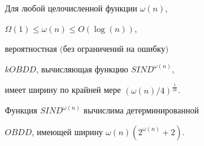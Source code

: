 \begin{thm}


Для любой целочисленной функции $\omega(n)$,


$\Omega(1) \le \omega(n) \le O(\log(n))$,


вероятностная $($без ограничений на ошибку$)$


$kOBDD$, вычисляющая функцию $SIND^{\omega(n)}$,


имеет ширину по крайней мере $(\omega(n)/4)^{\frac{1}{2k}}$.


Функция $SIND^{\omega(n)}$ вычислима детерминированной


$OBDD$, имеющей ширину $\omega(n)(2^{\omega(n)}+2)$.


\end{thm}








